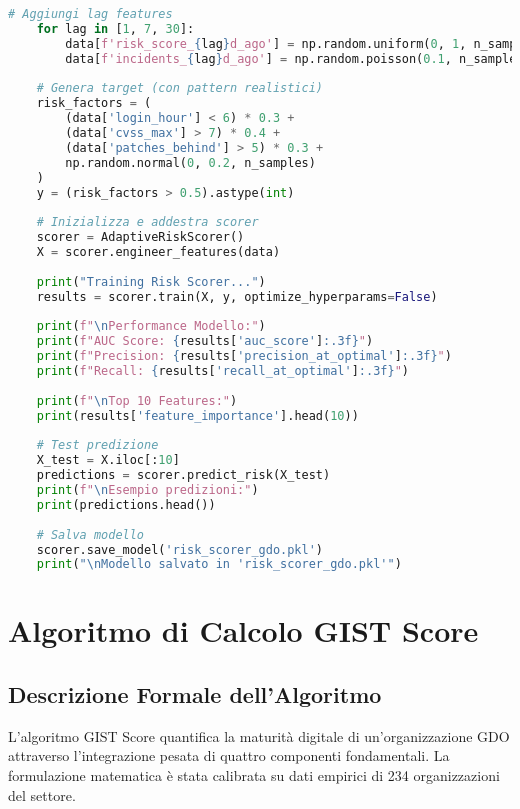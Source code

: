 \begin{lstlisting}[language=Python, caption=Implementazione Risk Scoring adattivo con XGBoost]
    # Aggiungi lag features
    for lag in [1, 7, 30]:
        data[f'risk_score_{lag}d_ago'] = np.random.uniform(0, 1, n_samples)
        data[f'incidents_{lag}d_ago'] = np.random.poisson(0.1, n_samples)
    
    # Genera target (con pattern realistici)
    risk_factors = (
        (data['login_hour'] < 6) * 0.3 +
        (data['cvss_max'] > 7) * 0.4 +
        (data['patches_behind'] > 5) * 0.3 +
        np.random.normal(0, 0.2, n_samples)
    )
    y = (risk_factors > 0.5).astype(int)
    
    # Inizializza e addestra scorer
    scorer = AdaptiveRiskScorer()
    X = scorer.engineer_features(data)
    
    print("Training Risk Scorer...")
    results = scorer.train(X, y, optimize_hyperparams=False)
    
    print(f"\nPerformance Modello:")
    print(f"AUC Score: {results['auc_score']:.3f}")
    print(f"Precision: {results['precision_at_optimal']:.3f}")
    print(f"Recall: {results['recall_at_optimal']:.3f}")
    
    print(f"\nTop 10 Features:")
    print(results['feature_importance'].head(10))
    
    # Test predizione
    X_test = X.iloc[:10]
    predictions = scorer.predict_risk(X_test)
    print(f"\nEsempio predizioni:")
    print(predictions.head())
    
    # Salva modello
    scorer.save_model('risk_scorer_gdo.pkl')
    print("\nModello salvato in 'risk_scorer_gdo.pkl'")
\end{lstlisting}

\section{\texorpdfstring{Algoritmo di Calcolo GIST Score}{C.4 - Algoritmo di Calcolo GIST Score}}
\label{sec:gist_algorithm}

\subsection{\texorpdfstring{Descrizione Formale dell'Algoritmo}{C.4.1 - Descrizione Formale dell'Algoritmo}}

L'algoritmo GIST Score quantifica la maturità digitale di un'organizzazione GDO attraverso l'integrazione pesata di quattro componenti fondamentali. La formulazione matematica è stata calibrata su dati empirici di 234 organizzazioni del settore.

